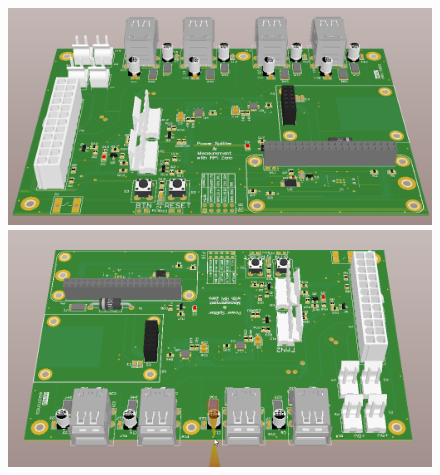 \documentclass[a4paper,14pt,oneside,pdflatex,english,final,twocolumn]{article}
\begin{document}
\begin{figure}[ht]
	\vspace{1cm}
	\begin{minipage}{0.47\textwidth}
		\includegraphics[width=1.0\textwidth,right]{img/Alt_Front.png}
	\end{minipage}
	\hfill
	\begin{minipage}{0.47\textwidth}
		\includegraphics[width=1.0\textwidth,right]{img/Alt_Back.png}

	\end{minipage}
\end{figure}
\end{document}
